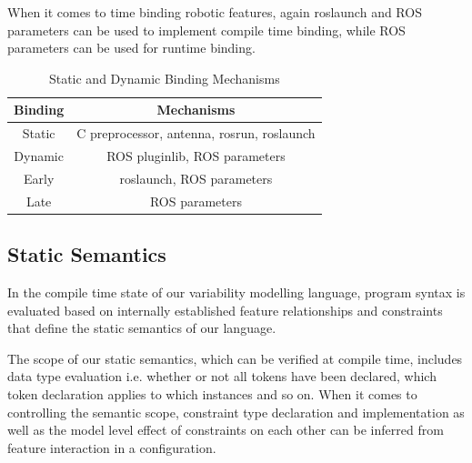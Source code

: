 \documentclass[conference]{IEEEtran}
\begin{document}
When it comes to time binding robotic features, again roslaunch and ROS parameters can be used to implement compile time binding, while ROS parameters can be used for runtime binding.

\begin{table}[htbp]
	\caption{Static and Dynamic Binding Mechanisms}
	\begin{center}
		\begin{tabular}{|c|c|}
			\hline
			Binding & Mechanisms  \\ \hline
			Static & C preprocessor, antenna, rosrun, roslaunch \\ \hline
			Dynamic &  ROS pluginlib, ROS parameters  \\ \hline
			Early &  roslaunch, ROS parameters  \\ \hline
			Late &  ROS parameters  \\ \hline
		\end{tabular}
		\label{tab:realmecha}
	\end{center}
\end{table}

\subsection{Static Semantics}
In the compile time state of our variability modelling language, program syntax is evaluated based on internally established feature relationships and constraints that define the static semantics of our language.

The scope of our static semantics, which can be verified  at compile time, includes data type evaluation i.e.  whether or not all tokens have been declared, which token declaration applies to which instances and so on. When it comes to controlling the semantic scope, constraint type declaration and implementation as well as the model level effect of constraints on each other can be inferred from feature interaction in a configuration.
\end{document}

